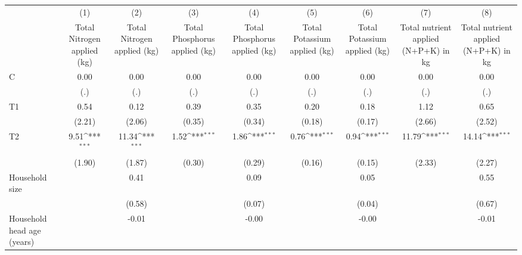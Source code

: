 {
\def\sym#1{\ifmmode^{#1}\else\(^{#1}\)\fi}
\begin{tabular}{l*{8}{c}}
\hline\hline
                &\multicolumn{1}{c}{(1)}&\multicolumn{1}{c}{(2)}&\multicolumn{1}{c}{(3)}&\multicolumn{1}{c}{(4)}&\multicolumn{1}{c}{(5)}&\multicolumn{1}{c}{(6)}&\multicolumn{1}{c}{(7)}&\multicolumn{1}{c}{(8)}\\
                &\multicolumn{1}{c}{Total Nitrogen applied (kg)}&\multicolumn{1}{c}{Total Nitrogen applied (kg)}&\multicolumn{1}{c}{Total Phosphorus applied (kg)}&\multicolumn{1}{c}{Total Phosphorus applied (kg)}&\multicolumn{1}{c}{Total Potassium applied (kg)}&\multicolumn{1}{c}{Total Potassium applied (kg)}&\multicolumn{1}{c}{Total nutrient applied (N+P+K) in kg}&\multicolumn{1}{c}{Total nutrient applied (N+P+K) in kg}\\
\hline
C               &     0.00         &     0.00         &     0.00         &     0.00         &     0.00         &     0.00         &     0.00         &     0.00         \\
                &      (.)         &      (.)         &      (.)         &      (.)         &      (.)         &      (.)         &      (.)         &      (.)         \\
T1              &     0.54         &     0.12         &     0.39         &     0.35         &     0.20         &     0.18         &     1.12         &     0.65         \\
                &   (2.21)         &   (2.06)         &   (0.35)         &   (0.34)         &   (0.18)         &   (0.17)         &   (2.66)         &   (2.52)         \\
T2              &     9.51\sym{***}&    11.34\sym{***}&     1.52\sym{***}&     1.86\sym{***}&     0.76\sym{***}&     0.94\sym{***}&    11.79\sym{***}&    14.14\sym{***}\\
                &   (1.90)         &   (1.87)         &   (0.30)         &   (0.29)         &   (0.16)         &   (0.15)         &   (2.33)         &   (2.27)         \\
Household size  &                  &     0.41         &                  &     0.09         &                  &     0.05         &                  &     0.55         \\
                &                  &   (0.58)         &                  &   (0.07)         &                  &   (0.04)         &                  &   (0.67)         \\
Household head age (years)&                  &    -0.01         &                  &    -0.00         &                  &    -0.00         &                  &    -0.01         \\

\end{tabular}}

